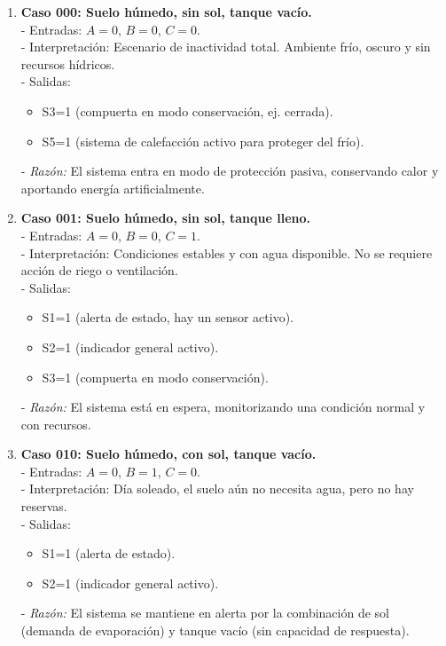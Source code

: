 \begin{enumerate}
    \item \textbf{Caso 000: Suelo húmedo, sin sol, tanque vacío.}\\
    - Entradas: $A=0$, $B=0$, $C=0$.\\
    - Interpretación: Escenario de inactividad total. Ambiente frío, oscuro y sin recursos hídricos.\\
    - Salidas: 
        \begin{itemize}
            \item S3=1 (compuerta en modo conservación, ej. cerrada). 
            \item S5=1 (sistema de calefacción activo para proteger del frío). 
        \end{itemize}
    - \emph{Razón:} El sistema entra en modo de protección pasiva, conservando calor y aportando energía artificialmente.

    \item \textbf{Caso 001: Suelo húmedo, sin sol, tanque lleno.}\\
    - Entradas: $A=0$, $B=0$, $C=1$.\\
    - Interpretación: Condiciones estables y con agua disponible. No se requiere acción de riego o ventilación.\\
    - Salidas: 
        \begin{itemize}
            \item S1=1 (alerta de estado, hay un sensor activo). 
            \item S2=1 (indicador general activo).
            \item S3=1 (compuerta en modo conservación).
        \end{itemize}
    - \emph{Razón:} El sistema está en espera, monitorizando una condición normal y con recursos.

    \item \textbf{Caso 010: Suelo húmedo, con sol, tanque vacío.}\\
    - Entradas: $A=0$, $B=1$, $C=0$.\\
    - Interpretación: Día soleado, el suelo aún no necesita agua, pero no hay reservas.\\
    - Salidas:
        \begin{itemize}
            \item S1=1 (alerta de estado).
            \item S2=1 (indicador general activo).
        \end{itemize}
    - \emph{Razón:} El sistema se mantiene en alerta por la combinación de sol (demanda de evaporación) y tanque vacío (sin capacidad de respuesta).


\end{enumerate}
